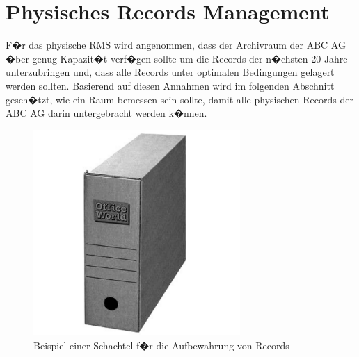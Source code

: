\documentclass[a4paper,twoside,10pt]{report}
\begin{document}
\section{Physisches Records Management}\label{subsec:raum_phys}
F�r das physische \ac{RMS} wird angenommen, dass der Archivraum der ABC AG �ber genug Kapazit�t verf�gen sollte um die Records der n�chsten 20 Jahre unterzubringen und, dass alle Records unter optimalen Bedingungen gelagert werden sollten. Basierend auf diesen Annahmen wird im folgenden Abschnitt gesch�tzt, wie ein Raum bemessen sein sollte, damit alle physischen Records der ABC AG darin untergebracht werden k�nnen.

\begin{figure}[htb]%
\centering
\includegraphics[width=0.7\textwidth]{archivbox.pdf}%
\caption{Beispiel einer Schachtel f�r die Aufbewahrung von Records \cite{officeworld}}%
\label{img:archbox}%
\end{figure}
\end{document}
